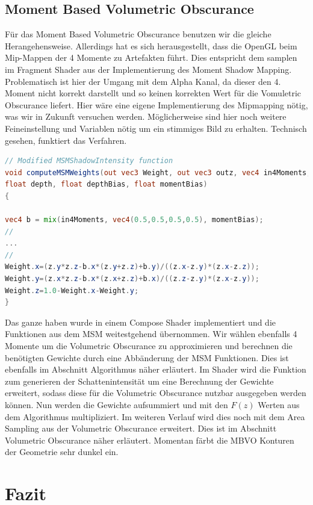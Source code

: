 \documentclass[runningheaders,a4paper]{llncs}
\begin{document}
\subsection{Moment Based Volumetric Obscurance}
Für das Moment Based Volumetric Obscurance benutzen wir die gleiche Herangehensweise. Allerdings hat es sich herausgestellt, dass die OpenGL beim Mip-Mappen der 4 Momente zu Artefakten führt. Dies entspricht dem samplen im Fragment Shader aus der Implementierung des Moment Shadow Mapping. Problematisch ist hier der Umgang mit dem Alpha Kanal, da dieser den 4. Moment nicht korrekt darstellt und so keinen  korrekten Wert für die Vomuletric Obscurance liefert. Hier wäre eine eigene Implementierung des Mipmapping nötig, was wir in Zukunft versuchen werden. Möglicherweise sind hier noch weitere Feineinstellung und Variablen nötig um ein stimmiges Bild zu erhalten. Technisch gesehen, funktiert das Verfahren.
\begin{lstlisting}[language=GLSL]
// Modified MSMShadowIntensity function
void computeMSMWeights(out vec3 Weight, out vec3 outz, vec4 in4Moments, 
float depth, float depthBias, float momentBias)
{

vec4 b = mix(in4Moments, vec4(0.5,0.5,0.5,0.5), momentBias);
//
...
//
Weight.x=(z.y*z.z-b.x*(z.y+z.z)+b.y)/((z.x-z.y)*(z.x-z.z));
Weight.y=(z.x*z.z-b.x*(z.x+z.z)+b.x)/((z.z-z.y)*(z.x-z.y));
Weight.z=1.0-Weight.x-Weight.y;
}
\end{lstlisting}
Das ganze haben wurde in einem Compose Shader implementiert und die Funktionen aus dem MSM weitestgehend übernommen.
Wir wählen ebenfalls 4 Momente um die Volumetric Obscurance zu approximieren und berechnen die benötigten Gewichte durch eine Abbänderung der MSM Funktionen. Dies ist ebenfalls im Abschnitt Algorithmus näher erläutert.
Im Shader wird die Funktion zum generieren der Schattenintensität um eine Berechnung der Gewichte erweitert, sodass diese für die Volumetric Obscurance nutzbar ausgegeben werden können. Nun werden die Gewichte aufsummiert und mit den $F(z)$ Werten aus dem Algorithmus multipliziert. Im weiteren Verlauf wird dies noch mit dem Area Sampling aus der Volumetric Obscurance erweitert. Dies ist im Abschnitt Volumetric Obscurance näher erläutert.
Momentan färbt die MBVO Konturen der Geometrie sehr dunkel ein.



\section{Fazit}
\end{document}
